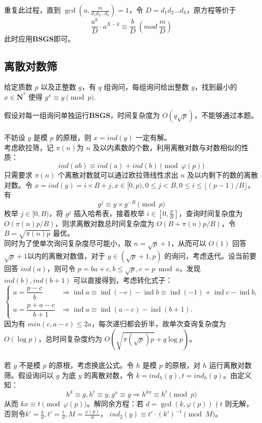 \documentclass[12pt,a4paper]{article}
\begin{document}
重复此过程，直到 $\displaystyle\gcd(a, \frac{m}{d_1d_2...d_k})=1$，令 $D=d_1d_2...d_k$，原方程等价于
\begin{equation*}
	\displaystyle \frac{a^k}{D}\cdot a^{X-k}\equiv\frac{b}{D}\ (mod\ \frac{m}{D})
\end{equation*}
此时应用\textbf{BSGS}即可。
\newpage
\subsection{离散对数筛}
\begin{mdframed}[leftline=true, linewidth=2pt, linecolor=gray]
	给定质数 $p$ 以及正整数 $g$，有 $q$ 组询问，每组询问给出整数 $y$，找到最小的 $x\in\mathbf{N^*}$ 使得 $g^x\equiv y\pmod p$.
\end{mdframed}
假设对每一组询问单独运行\textbf{BSGS}，时间复杂度为 $O(q\sqrt{p})$，不能够通过本题。\\
\\
不妨设 $g$ 是模 $p$ 的原根，则 $x=ind(y)$ 一定有解。\\
考虑欧拉筛，记 $\pi(n)$为 $n$ 及以内素数的个数，利用离散对数与对数相似的性质：
\begin{equation*}
	ind(ab)\equiv ind(a)+ind(b)\pmod{\varphi(p)}
\end{equation*}
只需要求 $\pi(n)$ 个离散对数就可以通过欧拉筛线性求出 $n$ 及以内剩下的数的离散对数。令 $x=ind(y)=i\times B+j,x\in[0,p),0\le j< B,0\le i\le\lfloor(p-1)/B\rfloor$，有
\begin{equation*}
	g^j\equiv y\times g^{-B}\pmod p
\end{equation*}
枚举 $j\in[0,B)$，将 $g^j$ 插入哈希表，接着枚举 $\displaystyle i\in[0,\frac{p}{B}]$，查询时间复杂度为 $O(\pi(n)p/B)$，则求离散对数总时间复杂度为 $O(B+\pi(n)p/B)$，令 $B=\sqrt{\pi(n)p}$ 最优。\\
同时为了使单次询问复杂度尽可能小，取 $n=\sqrt{p}+1$，从而可以 $O(1)$ 回答 $\sqrt{p}+1$以内的离散对数值，对于 $y\in(\sqrt{p}+1,p)$ 的询问，考虑迭代。设当前要回答 $ind(a)$，则可令 $p=ba+c,b\le\sqrt{p},c=p\bmod a$，发现 $ind(b),ind(b+1)$ 可以直接得到，考虑转化式子：
\[\begin{cases}
	a=\dfrac{p-c}{b} 
	&\Rightarrow \operatorname{ind} a \equiv \operatorname{ind}(-c)-\operatorname{ind} b 
	\equiv \operatorname{ind}(-1)+\operatorname{ind} c-\operatorname{ind} b, \\[6pt]
	a=\dfrac{p+a-c}{b+1} 
	&\Rightarrow \operatorname{ind} a \equiv \operatorname{ind}(a-c)-\operatorname{ind}(b+1).
\end{cases}\]
因为有 $min(c,a−c)\le2a$，每次递归都会折半，故单次查询复杂度为 $O(\log p)$，总时间复杂度约为 $O(\sqrt{\pi(\sqrt{p})p}+q\log{p})$。\\
\\
若 $g$ 不是模 $p$ 的原根，考虑换底公式。令 $h$ 是模 $p$ 的原根，对 $h$ 运行离散对数筛。假设询问以 $g$ 为底 $y$ 的离散对数，令 $k=ind_h(g),t=ind_h(y)$。由定义知：
\begin{equation*}
	h^k\equiv g,h^t\equiv y,g^x\equiv y\Rightarrow h^{kx}\equiv h^t\pmod{p}
\end{equation*}
从而 $kx\equiv t\pmod{\varphi(p)}$。解同余方程：若 $d=\gcd(k,\varphi(p))\nmid t$ 则无解，否则令$\displaystyle k'=\frac{k}{d},t'=\frac{t}{d},M=\frac{\varphi(p)}{d}$， $ind_2(y)\equiv t'\cdot (k')^{-1}\pmod M$。
\end{document}
